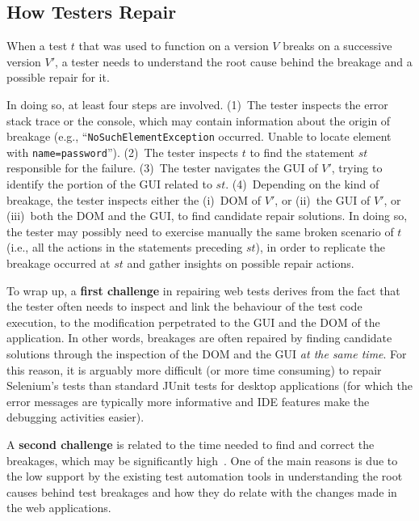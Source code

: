 \subsection{How Testers Repair}

When a test $t$ that was used to function on a version $V$  breaks on a successive version $V'$, a tester needs to understand the root cause behind the breakage and a possible repair for it. 

In doing so, at least four steps are involved. 
(1)~The tester inspects the error stack trace or the console, which may contain information about the origin of breakage (e.g., ``\texttt{NoSuchElementException} occurred. Unable to locate element with \mbox{\texttt{name=password}}''). 
(2)~The tester inspects $t$ to find the statement $st$ responsible for the failure. %
(3)~The tester navigates the GUI of $V'$, trying to identify the portion of the GUI related to $st$. 
(4)~Depending on the kind of breakage, the tester inspects either the (i)~DOM of $V'$, or (ii)~the GUI of $V'$, or (iii)~both the DOM and the GUI, to find candidate repair solutions. In doing so, the tester may possibly need to exercise manually the same broken scenario of $t$ (i.e., all the actions in the statements preceding $st$), in order to replicate the breakage occurred at $st$ and gather insights on possible repair actions.

To wrap up, a \textbf{first challenge} in repairing web tests derives from the fact that  
the tester often needs to inspect and link the behaviour of the test code execution, to the modification perpetrated to the GUI and the DOM of the application. 
In other words, breakages are often repaired by finding candidate solutions through the inspection of the DOM and the GUI \textit{at the same time}.
For this reason, it is arguably more difficult (or more time consuming) to repair Selenium's tests than standard JUnit tests for desktop applications (for which the error messages are typically more informative and IDE features make the debugging activities easier).

A \textbf{second challenge} is related to the time needed to find and correct the breakages, which may be significantly high~\cite{Leotta-TAIC-2013,JAMAICA2013}. One of the main reasons is due to the low support by the existing test automation tools in understanding the root causes behind test breakages and how they do relate with the changes made in the web applications. 

